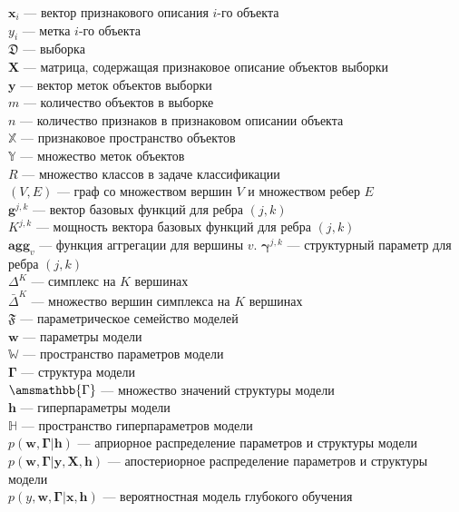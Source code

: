 \noindent$\mathbf{x}_i$ --- вектор признакового описания $i$-го объекта\\
$y_i$ --- метка $i$-го объекта\\
$\mathfrak{D}$ --- выборка\\
$\mathbf{X}$ --- матрица, содержащая признаковое описание объектов выборки\\
$\mathbf{y}$ --- вектор меток объектов выборки\\
$m$ --- количество объектов в выборке\\
$n$ --- количество признаков в признаковом описании объекта\\
$\mathbb{X}$ --- признаковое пространство объектов\\
$\mathbb{Y}$ --- множество меток объектов\\
$R$ --- множество классов в задаче классификации\\
$(V,E)$ --- граф со множеством вершин $V$ и множеством ребер $E$\\
$\mathbf{g}^{j,k}$ --- вектор базовых функций для ребра $(j,k)$\\
$K^{j,k}$ --- мощность вектора базовых функций для ребра $(j,k)$\\
$\textbf{agg}_v$ --- функция аггрегации для вершины $v$. 
$\boldsymbol{\gamma}^{j,k}$ --- структурный параметр для ребра $(j,k)$\\
$\Delta^{K}$ --- симплекс на $K$ вершинах\\
$\bar{\Delta}^{K}$ --- множество вершин симплекса на $K$ вершинах\\
$\mathfrak{F}$ --- параметрическое семейство моделей\\
$\mathbf{w}$ --- параметры модели\\
$\mathbb{W}$ --- пространство параметров модели\\
$\boldsymbol{\Gamma}$ --- структура модели\\
$\amsmathbb{\Gamma}$ --- множество значений структуры модели\\
$\mathbf{h}$ --- гиперпараметры модели\\
$\mathbb{H}$ --- пространство гиперпараметров модели\\
$p(\mathbf{w}, \boldsymbol{\Gamma}|\mathbf{h})$ --- априорное распределение параметров и структуры модели\\
$p(\mathbf{w}, \boldsymbol{\Gamma}|\mathbf{y}, \mathbf{X}, \mathbf{h})$ --- апостериорное распределение параметров и структуры модели\\
$p({y}, \mathbf{w},  \boldsymbol{\Gamma}|\mathbf{x}, \mathbf{h})$ --- вероятностная модель глубокого обучения\\
